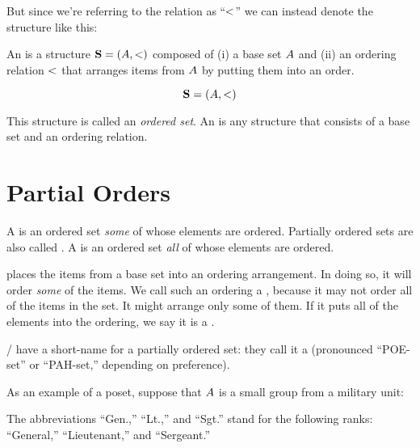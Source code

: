 \documentclass[../../../main.tex]{subfiles}
\begin{document}
But since we're referring to the relation as ``$\strictorder/$'' we can instead denote the structure like this:

\begin{terminology}
  An  is a structure $\struct{S} = (\set{A}, \strictorder/)$ composed of (i) a base set $A$ and (ii) an ordering relation $\strictorder/$ that arranges items from $A$ by putting them into an order. 
\end{terminology}

\begin{equation*}
  \struct{S} = (\set{A}, \strictorder/)
\end{equation*}

This structure is called an \emph{ordered set}. An  is any structure that consists of a base set and an ordering relation.


\section{Partial Orders}

\begin{terminology}
  A  is an ordered set \emph{some} of whose elements are ordered. Partially ordered sets are also called . A  is an ordered set \emph{all} of whose elements are ordered. 
\end{terminology}

 places the items from a base set into an ordering arrangement. In doing so, it will order \emph{some} of the items. We call such an ordering a , because it may not order all of the items in the set. It might arrange only some of them. If it puts all of the elements into the ordering, we say it is a .

\Mathers/ have a short-name for a partially ordered set: they call it a  (pronounced ``POE-set'' or ``PAH-set,'' depending on preference).

As an example of a poset, suppose that $A$ is a small group from a military unit:

\begin{aside}
  \begin{remark}
    The abbreviations ``Gen.,'' ``Lt.,'' and ``Sgt.'' stand for the following ranks: ``General,'' ``Lieutenant,'' and ``Sergeant.'' 
  \end{remark}
\end{aside}
\end{document}
